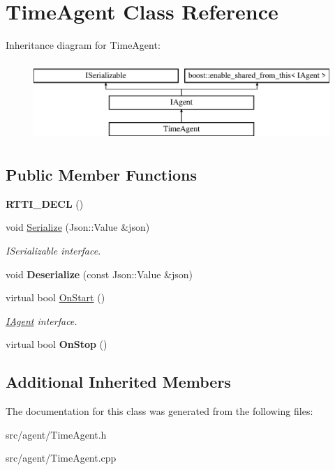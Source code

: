 \hypertarget{class_time_agent}{}\section{Time\+Agent Class Reference}
\label{class_time_agent}
Inheritance diagram for Time\+Agent\+:\begin{figure}[H]
\begin{center}
\leavevmode
\includegraphics[height=3.000000cm]{class_time_agent}
\end{center}
\end{figure}
\subsection*{Public Member Functions}
\begin{DoxyCompactItemize}
\item 
\mbox{\label{class_time_agent_a7fe20e74d387ff45be8dfb15e0ff47b9}} 
{\bfseries R\+T\+T\+I\+\_\+\+D\+E\+CL} ()
\item 
\mbox{\label{class_time_agent_a5fb5b6e5718387174f3f3613fc7a8146}} 
void \hyperlink{class_time_agent_a5fb5b6e5718387174f3f3613fc7a8146}{Serialize} (Json\+::\+Value \&json)
\begin{DoxyCompactList}\small\item\em I\+Serializable interface. \end{DoxyCompactList}\item 
\mbox{\label{class_time_agent_a0f9cb999ea581219f2ecad12457896ea}} 
void {\bfseries Deserialize} (const Json\+::\+Value \&json)
\item 
\mbox{\label{class_time_agent_afeb369ccdfe8dfb707f9755742c94f7f}} 
virtual bool \hyperlink{class_time_agent_afeb369ccdfe8dfb707f9755742c94f7f}{On\+Start} ()
\begin{DoxyCompactList}\small\item\em \hyperlink{class_i_agent}{I\+Agent} interface. \end{DoxyCompactList}\item 
\mbox{\label{class_time_agent_aad11bb646384325f2dc7248b8a69d599}} 
virtual bool {\bfseries On\+Stop} ()
\end{DoxyCompactItemize}
\subsection*{Additional Inherited Members}


The documentation for this class was generated from the following files\+:\begin{DoxyCompactItemize}
\item 
src/agent/Time\+Agent.\+h\item 
src/agent/Time\+Agent.\+cpp\end{DoxyCompactItemize}
